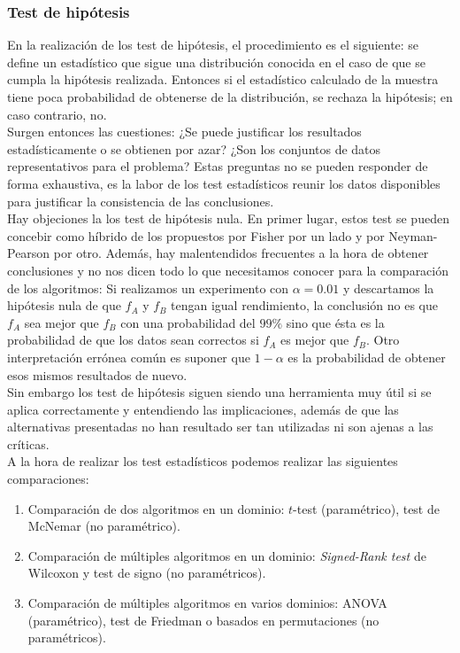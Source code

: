 \subsubsection{Test de hipótesis}

	En la realización de los test de hipótesis, el procedimiento es el siguiente: se define un estadístico que sigue una distribución conocida en el caso de que se cumpla la hipótesis realizada. Entonces si el estadístico calculado de la muestra tiene poca probabilidad de obtenerse de la distribución, se rechaza la hipótesis; en caso contrario, no. \\
	Surgen entonces las cuestiones: ¿Se puede justificar los resultados estadísticamente o se obtienen por azar? ¿Son los conjuntos de datos representativos para el problema? Estas preguntas no se pueden responder de forma exhaustiva, es la labor de los test estadísticos reunir los datos disponibles para justificar la consistencia de las conclusiones. \\
	Hay objeciones la los test de hipótesis nula. En primer lugar, estos test se pueden concebir como híbrido de los propuestos por Fisher por un lado y por Neyman-Pearson por otro. Además, hay malentendidos frecuentes a la hora de obtener conclusiones y no nos dicen todo lo que necesitamos conocer para la comparación de los algoritmos: Si realizamos un experimento con $\alpha=0.01$ y descartamos la hipótesis nula de que $f_A$ y $f_B$ tengan igual rendimiento, la conclusión no es que $f_A$ sea mejor que $f_B$ con una probabilidad del $99\%$ sino que ésta es la probabilidad de que los datos sean correctos si $f_A$ es mejor que $f_B$. Otro interpretación errónea común es suponer que $1-\alpha$ es la probabilidad de obtener esos mismos resultados de nuevo.\\
	Sin embargo los test de hipótesis siguen siendo una herramienta muy útil si se aplica correctamente y entendiendo las implicaciones, además de que las alternativas presentadas no han resultado ser tan utilizadas ni son ajenas a las críticas.\\
	A la hora de realizar los test estadísticos podemos realizar las siguientes comparaciones:
	\begin{enumerate}
	\item Comparación de dos algoritmos en un dominio: $t$-test (paramétrico), test de McNemar (no paramétrico).
	\item Comparación de múltiples algoritmos en un dominio: \textit{Signed-Rank test} de Wilcoxon y test de signo (no paramétricos).
	\item Comparación de múltiples algoritmos en varios dominios: ANOVA (paramétrico), test de Friedman o basados en permutaciones (no paramétricos). 
	\end{enumerate}

